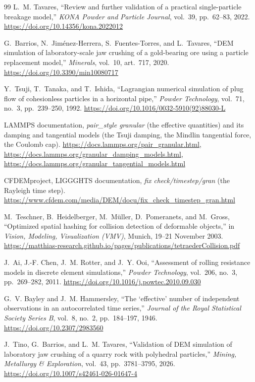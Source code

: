 \begin{thebibliography}{99}
 L.~M. Tavares, ``Review and further validation of a practical single-particle breakage model,'' \emph{KONA Powder and Particle
Journal}, vol.~39, pp.~62--83, 2022. \url{https://doi.org/10.14356/kona.2022012}

 G.~Barrios, N.~Jim\'enez-Herrera, S.~Fuentes-Torres, and L.~Tavares, ``DEM simulation of laboratory-scale jaw crushing of
a gold-bearing ore using a particle replacement model,'' \emph{Minerals}, vol.~10, art.~717, 2020. \url{https://doi.org/10.3390/min10080717}

 Y.~Tsuji, T.~Tanaka, and T.~Ishida, ``Lagrangian numerical simulation of plug flow of cohesionless particles in a horizontal pipe,''
\emph{Powder Technology}, vol.~71, no.~3, pp.~239--250, 1992. \url{https://doi.org/10.1016/0032-5910(92)88030-L}

 LAMMPS documentation, \emph{pair\_style granular} (the effective quantities) and its damping and tangential models (the Tsuji damping, the Mindlin tangential force, the Coulomb cap).
\url{https://docs.lammps.org/pair_granular.html}, \url{https://docs.lammps.org/granular_damping_models.html}, \url{https://docs.lammps.org/granular_tangential_models.html}

 CFDEMproject, LIGGGHTS documentation, \emph{fix check/timestep/gran} (the Rayleigh time step).
\url{https://www.cfdem.com/media/DEM/docu/fix_check_timestep_gran.html}

 M.~Teschner, B.~Heidelberger, M.~M\"uller, D.~Pomeranets, and M.~Gross, ``Optimized spatial hashing for collision detection of deformable
objects,'' in \emph{Vision, Modeling, Visualization (VMV)}, Munich, 19--21 November 2003.
\url{https://matthias-research.github.io/pages/publications/tetraederCollision.pdf}

 J.~Ai, J.-F. Chen, J.~M. Rotter, and J.~Y. Ooi, ``Assessment of rolling resistance models in discrete element simulations,''
\emph{Powder Technology}, vol.~206, no.~3, pp.~269--282, 2011. \url{https://doi.org/10.1016/j.powtec.2010.09.030}

 G.~V. Bayley and J.~M. Hammersley, ``The `effective' number of independent observations in an autocorrelated time series,''
\emph{Journal of the Royal Statistical Society Series B}, vol.~8, no.~2, pp.~184--197, 1946. \url{https://doi.org/10.2307/2983560}

 J.~Tino, G.~Barrios, and L.~M. Tavares, ``Validation of DEM simulation of laboratory jaw crushing of a quarry rock with polyhedral particles,''
\emph{Mining, Metallurgy \& Exploration}, vol.~43, pp.~3781--3795, 2026. \url{https://doi.org/10.1007/s42461-026-01647-4}


\end{thebibliography}
